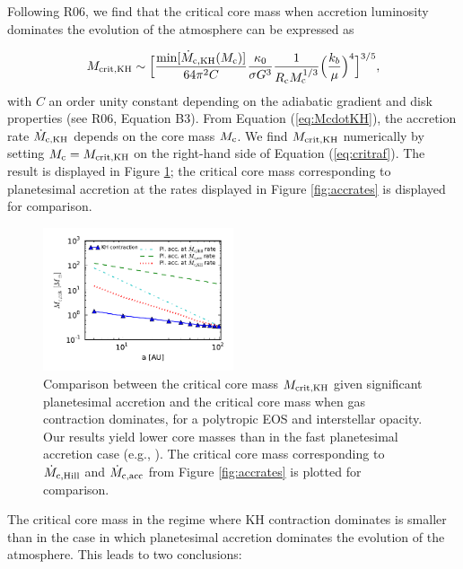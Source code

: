 \documentclass[apj]{emulateapj}
\newcommand{\co}{_{\rm c}}
\begin{document}
Following R06, we find that the critical core mass when accretion luminosity dominates the evolution of the atmosphere can be expressed as

\begin{equation}
\label{eq:critraf}
M_{\rm{crit, KH}} \sim \Big[\frac{\min[\dot{M}_{\rm c, KH}(M_{\rm{c}})]}{64 \pi^2 C} \frac{\kappa_0}{\sigma G^3} \frac{1}{R\co M\co^{1/3}} \Big(\frac{k_b}{\mu}\Big)^4\Big]^{3/5},
\end{equation}
with $C$ an order unity constant depending on the adiabatic gradient and disk properties (see R06, Equation B3). From Equation (\ref{eq:McdotKH}), the accretion rate $\dot{M}_{\rm c, KH}$ depends on the core mass $M\co$. We find $M_{\rm crit, KH}$ numerically by setting $M\co=M_{\rm crit, KH}$ on the right-hand side of Equation (\ref{eq:critraf}). The result is displayed in Figure \ref{fig:raf2}; the critical core mass corresponding to planetesimal accretion at the rates displayed in Figure \ref{fig:accrates} is displayed for comparison.  

 \begin{figure}[h]
\centering
\includegraphics[width=0.5\textwidth]{../../figs/ModelAtmospheres/RadSelfGravRealEOS/PaperFigs/Mc_vs_a_poly_comp.pdf}
\caption{Comparison between the critical core mass $M_{\rm{crit, KH}}$ given significant planetesimal accretion and the critical core mass when gas contraction dominates, for a polytropic EOS and interstellar opacity. Our results yield lower core masses than in the fast planetesimal accretion case (e.g., \citealt{rafikov06}). The critical core mass corresponding to $\dot{M}_{\rm c, Hill}$ and $\dot{M}_{\rm c, acc}$ from Figure \ref{fig:accrates} is plotted for comparison.}
\label{fig:raf2}
\end{figure}

The critical core mass in the regime where KH contraction dominates is smaller than in the case in which planetesimal accretion dominates the evolution of the atmosphere. This leads to two conclusions:
\end{document}
